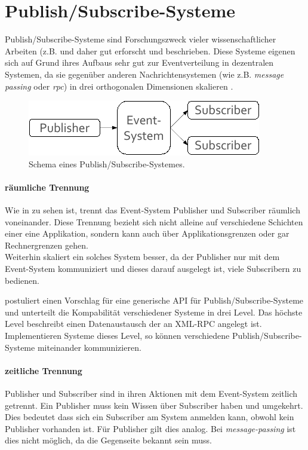 \section{Publish/Subscribe-Systeme}
\label{chap:grundlagen:pubsub}
Publish/Subscribe-Systeme sind Forschungszweck vieler wissenschaftlicher Arbeiten (z.B. \cite{Banerjee2001Comparative}  und daher gut erforscht und beschrieben. Diese Systeme eigenen sich auf Grund ihres Aufbaus sehr gut zur Eventverteilung in dezentralen Systemen, da sie gegenüber anderen Nachrichtensystemen (wie z.B. \emph{message passing} oder \emph{rpc}) in drei orthogonalen Dimensionen skalieren \cite{PatrickTh2003Many}.

\begin{figure}[htbp]
\centering
\includegraphics{grafics/pubsub_black_box.pdf}
\caption{Schema eines Publish/Subscribe-Systemes.}
\label{fig:pubsub_black_box}
\end{figure}

\paragraph{räumliche Trennung}
Wie in  zu sehen ist, trennt das Event-System Publisher und Subscriber räumlich voneinander. Diese Trennung bezieht sich nicht alleine auf verschiedene Schichten einer eine Applikation, sondern kann auch über Applikationsgrenzen oder gar Rechnergrenzen gehen.\\
Weiterhin skaliert ein solches System besser, da der Publisher nur mit dem Event-System kommuniziert und dieses darauf ausgelegt ist, viele Subscribern zu bedienen.

\cite{PiEyKoSh2007-PubSubAPI} postuliert einen Vorschlag für eine generische API für Publish/Subscribe-Systeme und unterteilt die Kompabilität verschiedener Systeme in drei Level. Das höchste Level beschreibt einen Datenaustausch der an XML-RPC angelegt ist. Implementieren Systeme dieses Level, so können verschiedene Publish/Subscribe-Systeme miteinander kommunizieren.

\paragraph{zeitliche Trennung}
Publisher und Subscriber sind in ihren Aktionen mit dem Event-System zeitlich getrennt. Ein Publisher muss kein Wissen über Subscriber haben und umgekehrt. Dies bedeutet dass sich ein Subscriber am System anmelden kann, obwohl kein Publisher vorhanden ist. Für Publisher gilt dies analog. Bei \emph{message-passing} ist dies nicht möglich, da die Gegenseite bekannt sein muss.

